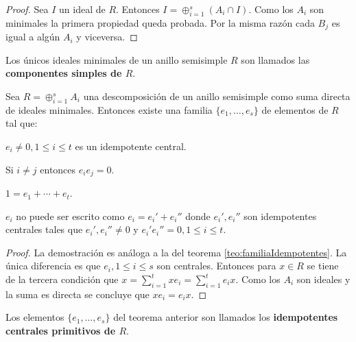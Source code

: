 \begin{proof}
Sea $I$ un ideal de $R$. Entonces $I = \oplus_{i = 1}^{s}(A_i \cap I)$. Como los $A_i$ son minimales la primera propiedad queda probada. Por la misma razón cada $B_j$ es igual a algún $A_i$ y viceversa. 
\end{proof}
\begin{definicion}
Los únicos ideales minimales de un anillo semisimple $R$ son llamados las \textbf{componentes simples de $R$}. 
\end{definicion}
\begin{teorema}
Sea $R = \oplus_{i = 1}^sA_i$ una descomposición de un anillo semisimple como suma directa de ideales minimales. Entonces existe una familia $\{e_1, \dots, e_s \}$ de elementos de $R$ tal que:
\begin{bulletList}
\item $e_i \neq 0, 1\leq i  \leq t$ es un idempotente central.
\item Si $i \neq j$ entonces $e_ie_j = 0$.
\item $1 = e_1 + \cdots + e_t$.
\item $e_i$ no puede ser escrito como $e_i = e_i'+e_i''$ donde $e_i', e_i''$ son idempotentes centrales tales que $e_i',e_i'' \neq 0$ y $e_i'e_i'' = 0, 1\leq i \leq t$.
\end{bulletList}
\end{teorema}
\begin{proof}
La demostración es análoga a la del teorema \ref{teo:familiaIdempotentes}. La única diferencia es que $e_i, 1\leq i \leq s$ son centrales. Entonces para $x \in R$ se tiene de la tercera condición que $x = \sum_{i=1}^{t}xe_i = \sum_{i=1}^{t}e_ix$. Como los $A_i$ son ideales y la suma es directa se concluye que $xe_i = e_ix$.
\end{proof}
\begin{definicion}
Los elementos $\{ e_1, \dots, e_s \}$ del  teorema anterior son llamados los \textbf{idempotentes centrales primitivos de $R$}.
\end{definicion}
